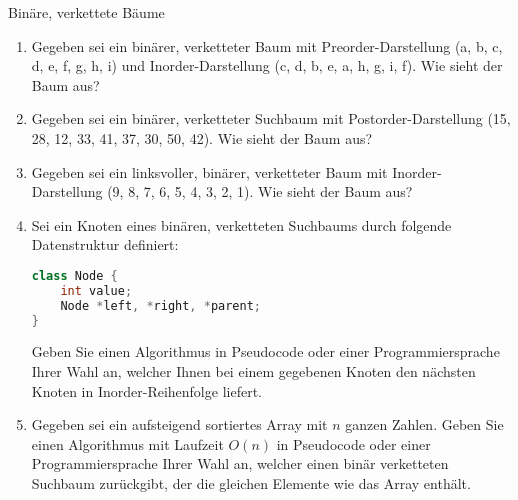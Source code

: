 \documentclass[11pt,a4paper]{article}
\begin{document}
\begin{aufgabe}{4}{Binäre, verkettete Bäume}
    \begin{enumerate}
        \item Gegeben sei ein binärer, verketteter Baum mit Preorder-Darstellung (a, b, c, d, e, f, g, h, i) und Inorder-Darstellung (c, d, b, e, a, h, g, i, f).
        Wie sieht der Baum aus?
        \item Gegeben sei ein binärer, verketteter Suchbaum mit Postorder-Darstellung (15, 28, 12, 33, 41, 37, 30, 50, 42).
        Wie sieht der Baum aus?
        \item Gegeben sei ein linksvoller, binärer, verketteter Baum mit Inorder-Darstellung (9, 8, 7, 6, 5, 4, 3, 2, 1).
        Wie sieht der Baum aus?
        \item Sei ein Knoten eines binären, verketteten Suchbaums durch folgende Datenstruktur definiert:
        \begin{lstlisting}[language=c++]
class Node {
    int value;
    Node *left, *right, *parent;
} 
        \end{lstlisting}
        Geben Sie einen Algorithmus in Pseudocode oder einer Programmiersprache Ihrer Wahl an, welcher Ihnen bei einem gegebenen Knoten den nächsten Knoten in Inorder-Reihenfolge liefert.
        \item
        Gegeben sei ein aufsteigend sortiertes Array mit $n$ ganzen Zahlen.
        Geben Sie einen Algorithmus mit Laufzeit $O(n)$ in Pseudocode oder einer Programmiersprache Ihrer Wahl an, welcher einen binär verketteten Suchbaum zurückgibt, der die gleichen Elemente wie das Array enthält.
    \end{enumerate}
\end{aufgabe}
\end{document}
